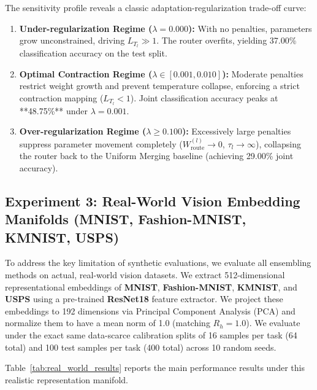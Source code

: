The sensitivity profile reveals a classic adaptation-regularization trade-off curve:
\begin{enumerate}
  \item \textbf{Under-regularization Regime ($\lambda = 0.000$):} With no penalties, parameters grow unconstrained, driving $L_{T_l} \gg 1$. The router overfits, yielding 37.00\% classification accuracy on the test split.
  \item \textbf{Optimal Contraction Regime ($\lambda \in [0.001, 0.010]$):} Moderate penalties restrict weight growth and prevent temperature collapse, enforcing a strict contraction mapping ($L_{T_l} < 1$). Joint classification accuracy peaks at **48.75\%** under $\lambda = 0.001$.
  \item \textbf{Over-regularization Regime ($\lambda \ge 0.100$):} Excessively large penalties suppress parameter movement completely ($W_{\text{route}}^{(l)} \to 0$, $\tau_l \to \infty$), collapsing the router back to the Uniform Merging baseline (achieving 29.00\% joint accuracy). 
\end{enumerate}

\subsection{Experiment 3: Real-World Vision Embedding Manifolds (MNIST, Fashion-MNIST, KMNIST, USPS)}
To address the key limitation of synthetic evaluations, we evaluate all ensembling methods on actual, real-world vision datasets. We extract 512-dimensional representational embeddings of \textbf{MNIST}, \textbf{Fashion-MNIST}, \textbf{KMNIST}, and \textbf{USPS} using a pre-trained \textbf{ResNet18} feature extractor. We project these embeddings to 192 dimensions via Principal Component Analysis (PCA) and normalize them to have a mean norm of 1.0 (matching $R_h = 1.0$). We evaluate under the exact same data-scarce calibration splits of 16 samples per task (64 total) and 100 test samples per task (400 total) across 10 random seeds.

Table~\ref{tab:real_world_results} reports the main performance results under this realistic representation manifold.


